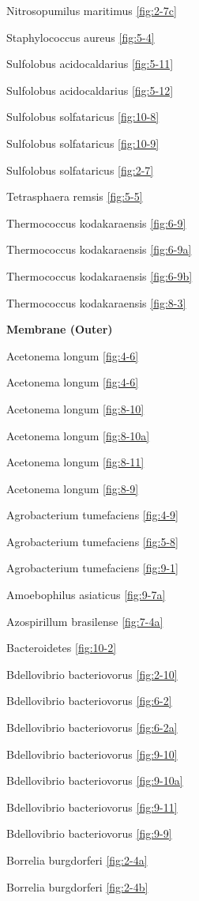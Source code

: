 \documentclass[]{tufte-book}
\begin{document}
Nitrosopumilus maritimus \ref{fig:2-7c}

Staphylococcus aureus \ref{fig:5-4}

Sulfolobus acidocaldarius \ref{fig:5-11}

Sulfolobus acidocaldarius \ref{fig:5-12}

Sulfolobus solfataricus \ref{fig:10-8}

Sulfolobus solfataricus \ref{fig:10-9}

Sulfolobus solfataricus \ref{fig:2-7}

Tetrasphaera remsis \ref{fig:5-5}

Thermococcus kodakaraensis \ref{fig:6-9}

Thermococcus kodakaraensis \ref{fig:6-9a}

Thermococcus kodakaraensis \ref{fig:6-9b}

Thermococcus kodakaraensis \ref{fig:8-3}

\textbf{Membrane (Outer)}

Acetonema longum \ref{fig:4-6}

Acetonema longum \ref{fig:4-6}

Acetonema longum \ref{fig:8-10}

Acetonema longum \ref{fig:8-10a}

Acetonema longum \ref{fig:8-11}

Acetonema longum \ref{fig:8-9}

Agrobacterium tumefaciens \ref{fig:4-9}

Agrobacterium tumefaciens \ref{fig:5-8}

Agrobacterium tumefaciens \ref{fig:9-1}

Amoebophilus asiaticus \ref{fig:9-7a}

Azospirillum brasilense \ref{fig:7-4a}

Bacteroidetes \ref{fig:10-2}

Bdellovibrio bacteriovorus \ref{fig:2-10}

Bdellovibrio bacteriovorus \ref{fig:6-2}

Bdellovibrio bacteriovorus \ref{fig:6-2a}

Bdellovibrio bacteriovorus \ref{fig:9-10}

Bdellovibrio bacteriovorus \ref{fig:9-10a}

Bdellovibrio bacteriovorus \ref{fig:9-11}

Bdellovibrio bacteriovorus \ref{fig:9-9}

Borrelia burgdorferi \ref{fig:2-4a}

Borrelia burgdorferi \ref{fig:2-4b}
\end{document}
